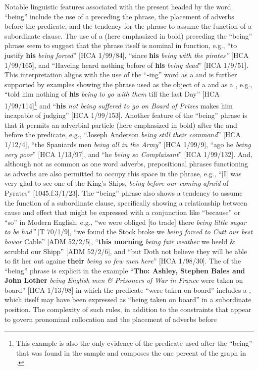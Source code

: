 Notable linguistic features associated with the present  headed by the word “being” include the use of a   preceding the phrase, the placement of adverbs before the predicate, and the tendency for the phrase to assume the function of a subordinate clause. The use of a   (here emphasized in bold) preceding the “being” phrase seem to suggest that the phrase itself is nominal in function, e.g., “to justify \textbf{his} \textit{being forced}” [HCA 1/99/84], “since \textbf{his} \textit{being with the pirates”} [HCA 1/99/165], and “Haveing heard nothing before of \textbf{his} \textit{being dead}” [HCA 1/9/51]. This interpretation aligns with the use of the “-ing” word as a  and is further supported by examples showing the phrase used as the object of a  and as a , e.g., “told him nothing of \textbf{his} \textit{being to go with them} till the last Day” [HCA 1/99/114]\footnote{This example is also the only evidence of the  predicate used after the  “being” that was found in the sample and composes the one percent of the graph in .}  and “\textbf{his} \textit{not being suffered to go on Board of Prizes} makes him incapable of judging” [HCA 1/99/153].  Another feature of the “being” phrase is that it permits an adverbial particle (here emphasized in bold) after the  and before the predicate, e.g., “Joseph Anderson \textit{being \textit{still} their} \textit{command}” [HCA 1/12/4], “the Spaniards men \textit{being \textit{all} in} \textit{the Army}” [HCA 1/99/9], “ago he \textit{being \textit{very} poor}” [HCA 1/13/97], and “he \textit{being \textit{so} Complaisant}” [HCA 1/99/132]. And, although not as common as one word adverbs, prepositional phrases functioning as adverbs are also permitted to occupy this space in the phrase, e.g., “[I] was very glad to see one of the King’s Ships, \textit{being \textit{before our coming} afraid} of Pyrates” [1045.f.3/1/23]. The “being” phrase also shows a tendency to assume the function of a subordinate clause, specifically showing a relationship between cause and effect that might be expressed with a conjunction like “because” or “so” in Modern English, e.g., “we were obliged [to trade] there \textit{being little sugar to be had”} [T 70/1/9], “we found the Stock broke we \textit{being forced to Cutt our best bowar} Cable” [ADM 52/2/5], “\textbf{this morning} \textit{being fair weather} we heeld \& scrubbd our Shipp” [ADM 52/2/6], and “but Doth not believe they will be able to fit her out againe \textbf{their} \textit{being so few men here}” [HCA 1/98/30]. The  of the “being” phrase is explicit in the example “\textbf{Tho: Ashley, Stephen Bales and John Lother} \textit{being English men \& Prisoners of War in France} were taken on board” [HCA 1/13/98] in which the  predicate “were taken on board” includes a , which itself may have been expressed as “being taken on board” in a subordinate position. The complexity of such  rules, in addition to the constraints that appear to govern  pronominal collocation and the placement of adverbs before 